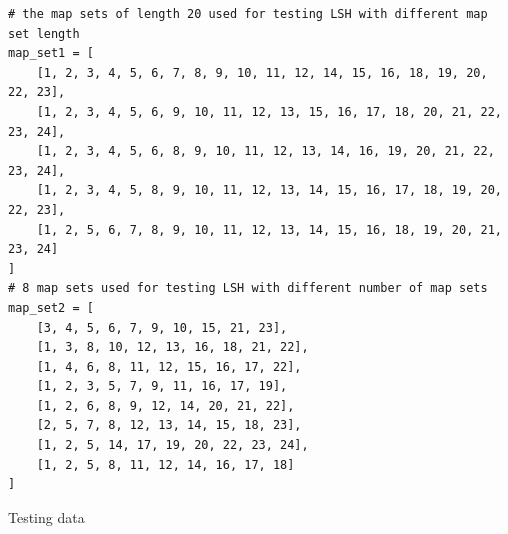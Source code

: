 \documentclass{ee208report}
\begin{document}
\begin{listing}
    \begin{verbatim}
# the map sets of length 20 used for testing LSH with different map set length
map_set1 = [
    [1, 2, 3, 4, 5, 6, 7, 8, 9, 10, 11, 12, 14, 15, 16, 18, 19, 20, 22, 23],
    [1, 2, 3, 4, 5, 6, 9, 10, 11, 12, 13, 15, 16, 17, 18, 20, 21, 22, 23, 24],
    [1, 2, 3, 4, 5, 6, 8, 9, 10, 11, 12, 13, 14, 16, 19, 20, 21, 22, 23, 24],
    [1, 2, 3, 4, 5, 8, 9, 10, 11, 12, 13, 14, 15, 16, 17, 18, 19, 20, 22, 23],
    [1, 2, 5, 6, 7, 8, 9, 10, 11, 12, 13, 14, 15, 16, 18, 19, 20, 21, 23, 24]
]
# 8 map sets used for testing LSH with different number of map sets
map_set2 = [
    [3, 4, 5, 6, 7, 9, 10, 15, 21, 23],
    [1, 3, 8, 10, 12, 13, 16, 18, 21, 22],
    [1, 4, 6, 8, 11, 12, 15, 16, 17, 22],
    [1, 2, 3, 5, 7, 9, 11, 16, 17, 19],
    [1, 2, 6, 8, 9, 12, 14, 20, 21, 22],
    [2, 5, 7, 8, 12, 13, 14, 15, 18, 23],
    [1, 2, 5, 14, 17, 19, 20, 22, 23, 24],
    [1, 2, 5, 8, 11, 12, 14, 16, 17, 18]
]
    \end{verbatim}
    \caption{Testing data}
    \label{lst:testing-data}
\end{listing}
\end{document}

